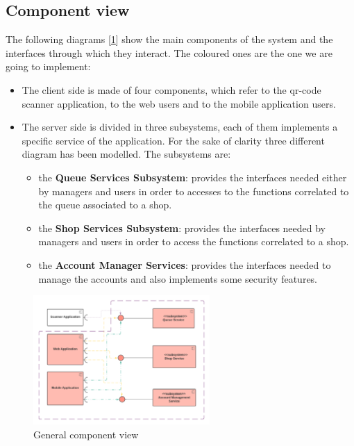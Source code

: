 \subsection{Component view}
\label{subsect:componentview}
The following diagrams [\ref{fig:ComponentViewHighLevel}] show the main components of the system and the interfaces through which they interact. The coloured ones are the one we are going to implement:
\begin{itemize}
    \item The client side is made of four components, which refer to the qr-code scanner application, to the web users and to the mobile application users.
    \item The server side is divided in three subsystems, each of them implements a specific service of the application. For the sake of clarity three different diagram has been modelled. The subsystems are:
    \begin{itemize}
        \item the \textbf{Queue Services Subsystem}: provides the interfaces needed either by managers and users in order to accesses to the functions correlated to the queue associated to a shop. 
        \item the \textbf{Shop Services Subsystem}: provides the interfaces needed by managers and users in order to access the functions correlated to a shop.
        \item the \textbf{Account Manager Services}: provides the interfaces needed to manage the accounts and also implements some security features.
    \end{itemize}
\end{itemize}
\begin{figure}[h!]
    \centering
    \includegraphics[width=0.6\textwidth]{Images/ComponentViewHighLevel (1).png}
    \caption{\label{fig:ComponentViewHighLevel}{General component view}}
\end{figure}

